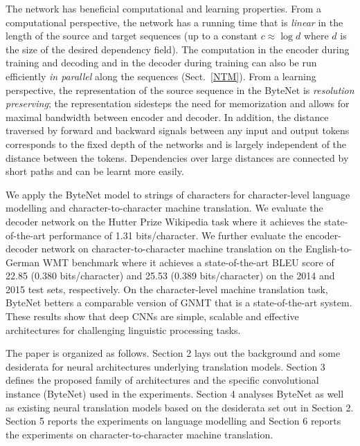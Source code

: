 \documentclass{article}
\begin{document}
The network has  beneficial computational and learning properties. From a computational perspective, the network has a running time that is \emph{linear} in the length of the source and target sequences (up to a constant $c \approx \log d$ where $d$ is the size of the desired dependency field). The computation in the encoder during training and decoding and in the decoder during training can also be run efficiently \emph{in parallel} along the sequences (Sect.~\ref{NTM}).
From a learning perspective, the representation of the source sequence in the ByteNet is \emph{resolution preserving}; the representation sidesteps the need for memorization and allows for maximal bandwidth between encoder and decoder. In addition, the distance traversed by forward and backward signals between any input and output tokens corresponds to the fixed depth of the networks and is largely independent of the distance between the tokens. Dependencies over large distances are connected by short paths and can be learnt more easily. 



We apply the ByteNet model to strings of characters for character-level language modelling and character-to-character machine translation. We evaluate the decoder network on the Hutter Prize Wikipedia task \citep{hutterprize} where it achieves the state-of-the-art performance of 1.31 bits/character. We further evaluate the encoder-decoder network on character-to-character machine translation on the English-to-German WMT benchmark where it achieves a state-of-the-art BLEU score of 22.85 (0.380 bits/character) and 25.53 (0.389 bits/character) on the 2014 and 2015 test sets, respectively. On the character-level machine translation task, ByteNet betters a comparable version of GNMT \citep{wu2016} that is a state-of-the-art system. These results show that deep CNNs are simple, scalable and effective architectures for challenging linguistic processing tasks.

The paper is organized as follows. Section 2 lays out the background and some desiderata for neural architectures underlying translation models. Section 3 defines the proposed family of architectures and the specific convolutional instance (ByteNet) used in the experiments. Section 4 analyses ByteNet as well as existing neural translation models based on the desiderata set out in Section 2. Section 5 reports the experiments on language modelling and Section 6 reports the experiments on character-to-character machine translation.
\end{document}

